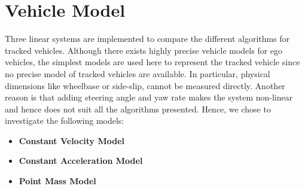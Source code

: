 \section{Vehicle Model}
Three linear systems are implemented to compare the different algorithms for tracked vehicles. Although there exists highly precise vehicle models for ego vehicles, the simplest models are used here to represent the tracked vehicle since no precise model of tracked vehicles are available. In particular, physical dimensions like wheelbase or side-slip, cannot be measured directly. Another reason is that adding steering angle and yaw rate makes the system non-linear and hence does not suit all the algorithms presented. Hence, we chose to investigate the following models:
\begin{itemize}
\item \textbf{Constant Velocity Model}
\item \textbf{Constant Acceleration Model}
\item \textbf{Point Mass Model}
\end{itemize}
